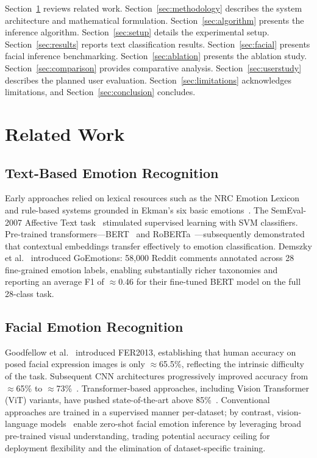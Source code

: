 \documentclass[sigconf, review=true]{acmart}
\begin{document}
Section~\ref{sec:related} reviews related work.
Section~\ref{sec:methodology} describes the system architecture
and mathematical formulation.
Section~\ref{sec:algorithm} presents the inference algorithm.
Section~\ref{sec:setup} details the experimental setup.
Section~\ref{sec:results} reports text classification results.
Section~\ref{sec:facial} presents facial inference benchmarking.
Section~\ref{sec:ablation} presents the ablation study.
Section~\ref{sec:comparison} provides comparative analysis.
Section~\ref{sec:userstudy} describes the planned user evaluation.
Section~\ref{sec:limitations} acknowledges limitations, and
Section~\ref{sec:conclusion} concludes.

\section{Related Work}
\label{sec:related}

\subsection{Text-Based Emotion Recognition}

Early approaches relied on lexical resources such as the NRC
Emotion Lexicon~\cite{mohammad2013crowdsourcing} and rule-based
systems grounded in Ekman's six basic
emotions~\cite{ekman1992}.
The SemEval-2007 Affective Text task~\cite{strapparava2007semeval}
stimulated supervised learning with SVM classifiers.
Pre-trained transformers---BERT~\cite{devlin2019bert} and
RoBERTa~\cite{liu2019roberta}---subsequently demonstrated that
contextual embeddings transfer effectively to emotion classification.
Demszky et al.~\cite{demszky2020goemotions} introduced
GoEmotions: 58,000 Reddit comments annotated across 28 fine-grained
emotion labels, enabling substantially richer taxonomies and
reporting an average F1 of $\approx$0.46 for their fine-tuned
BERT model on the full 28-class task.

\subsection{Facial Emotion Recognition}

Goodfellow et al.~\cite{goodfellow2013fer} introduced FER2013,
establishing that human accuracy on posed facial expression images
is only $\approx$65.5\%, reflecting the intrinsic difficulty of
the task.
Subsequent CNN architectures progressively improved accuracy from
$\approx$65\% to $\approx$73\%~\cite{li2022fer_survey}.
Transformer-based approaches, including Vision Transformer (ViT)
variants, have pushed state-of-the-art above
85\%~\cite{li2022fer_survey}.
Conventional approaches are trained in a supervised manner
per-dataset; by contrast, vision-language
models~\cite{alayrac2022flamingo} enable zero-shot facial
emotion inference by leveraging broad pre-trained visual
understanding, trading potential accuracy ceiling for
deployment flexibility and the elimination of dataset-specific
training.
\end{document}
